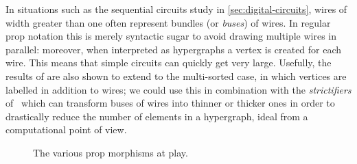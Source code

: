 In situations such as the sequential circuits study in \cref{sec:digital-circuits},
wires of width greater than one often represent bundles (or \emph{buses}) of
wires.
In regular prop notation this is merely syntactic sugar to avoid drawing
multiple wires in parallel: moreover, when interpreted as hypergraphs a vertex
is created for each wire.
This means that simple circuits can quickly get very large.
Usefully, the results of \cite{bonchi2021string} are also shown to extend to the
multi-sorted case, in which vertices are labelled in addition to wires; we could
use this in combination with the \emph{strictifiers} of~\cite{wilson2022string}
which can transform buses of wires into thinner or thicker ones in order to
drastically reduce the number of elements in a hypergraph, ideal from a
computational point of view.


\begin{figure}
    \centering
    
    \caption{The various prop morphisms at play.}
    \label{fig:roadmap}
\end{figure}
